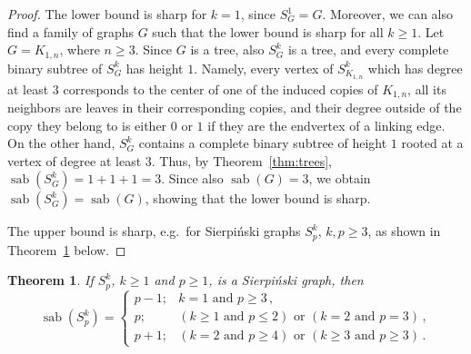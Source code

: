 \documentclass[12pt]{article}
\newtheorem{theorem}{Theorem}[section]
\DeclareMathOperator{\sab}{\mathrm{sab}}
\begin{document}
\begin{proof}
The lower bound is sharp for $k=1$, since $S_G^1=G$. Moreover, we can also find a family of graphs $G$ such that the lower bound is sharp for all $k \geq 1$. Let $G=K_{1,n}$, where $n\ge 3$. Since $G$ is a tree, also $S^k_G$ is a tree, and every complete binary subtree of $S^k_G$ has height $1$. Namely, every vertex of $S^k_{K_{1,n}}$ which has degree at least $3$ corresponds to the center of one of the induced copies of $K_{1,n}$, all its neighbors are leaves in their corresponding copies, and their degree outside of the copy they belong to is either $0$ or $1$ if they are the endvertex of a linking edge. On the other hand, $S^k_G$ contains a complete binary subtree of height $1$ rooted at a vertex of degree at least $3$.  Thus, by Theorem~\ref{thm:trees}, $\sab(S_G^k)=1+1+1=3$. Since also $\sab(G)=3$, we obtain $\sab(S_G^k)=\sab(G)$, showing that the lower bound is sharp.

The upper bound is sharp, e.g.\ for Sierpi\'nski graphs $S^k_p$, $k,p\ge 3$, as shown in Theorem~\ref{thm:sierpinski} below.
\end{proof}

\begin{theorem}
\label{thm:sierpinski}
If $S^k_p$, $k\ge 1$ and $p\ge 1$, is a Sierpi\'nski graph, then 
$$\sab(S^k_p) =  
\begin{cases}
p-1; & k=1 \mbox{ and } p \ge 3\,,\\[5pt]
p; & (k\ge 1 \mbox{ and } p \le 2) \mbox{ or } (k=2 \mbox{ and } p=3)\,,\\[5pt]
p+1; & (k=2 \mbox{ and } p \ge 4) \mbox{ or } (k\ge 3 \mbox{ and } p\ge 3)\,.
\end{cases}$$ 
\end{theorem}
\end{document}
